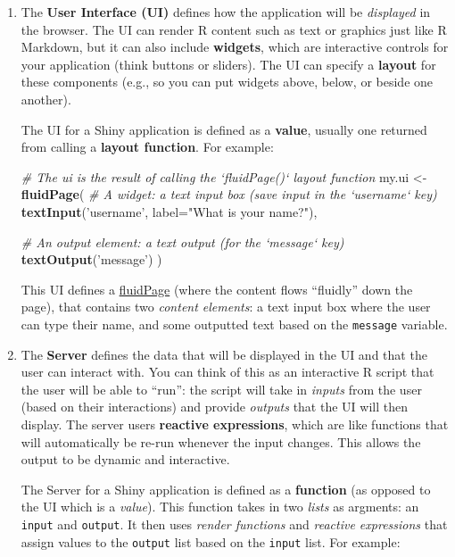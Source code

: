 \documentclass[]{book}
\newenvironment{Shaded}{\begin{snugshade}}{\end{snugshade}}
\newcommand{\KeywordTok}[1]{\textcolor[rgb]{0.13,0.29,0.53}{\textbf{#1}}}
\newcommand{\DataTypeTok}[1]{\textcolor[rgb]{0.13,0.29,0.53}{#1}}
\newcommand{\StringTok}[1]{\textcolor[rgb]{0.31,0.60,0.02}{#1}}
\newcommand{\CommentTok}[1]{\textcolor[rgb]{0.56,0.35,0.01}{\textit{#1}}}
\newcommand{\NormalTok}[1]{#1}
\theoremstyle{definition}
\theoremstyle{definition}
\theoremstyle{remark}
\begin{document}
\begin{enumerate}
\def\labelenumi{\arabic{enumi}.}
\item
  The \textbf{User Interface (UI)} defines how the application will be
  \emph{displayed} in the browser. The UI can render R content such as
  text or graphics just like R Markdown, but it can also include
  \textbf{widgets}, which are interactive controls for your application
  (think buttons or sliders). The UI can specify a \textbf{layout} for
  these components (e.g., so you can put widgets above, below, or beside
  one another).

  The UI for a Shiny application is defined as a \textbf{value}, usually
  one returned from calling a \textbf{layout function}. For example:

\begin{Shaded}
\begin{Highlighting}[]
\CommentTok{# The ui is the result of calling the `fluidPage()` layout function}
\NormalTok{my.ui <-}\StringTok{ }\KeywordTok{fluidPage}\NormalTok{(}
  \CommentTok{# A widget: a text input box (save input in the `username` key)}
  \KeywordTok{textInput}\NormalTok{(}\StringTok{'username'}\NormalTok{, }\DataTypeTok{label=}\StringTok{"What is your name?"}\NormalTok{),}

  \CommentTok{# An output element: a text output (for the `message` key)}
  \KeywordTok{textOutput}\NormalTok{(}\StringTok{'message'}\NormalTok{)}
\NormalTok{)}
\end{Highlighting}
\end{Shaded}

  This UI defines a
  \href{https://shiny.rstudio.com/reference/shiny/latest/fluidPage.html}{fluidPage}
  (where the content flows ``fluidly'' down the page), that contains two
  \emph{content elements}: a text input box where the user can type
  their name, and some outputted text based on the \texttt{message}
  variable.
\item
  The \textbf{Server} defines the data that will be displayed in the UI
  and that the user can interact with. You can think of this as an
  interactive R script that the user will be able to ``run'': the script
  will take in \emph{inputs} from the user (based on their interactions)
  and provide \emph{outputs} that the UI will then display. The server
  users \textbf{reactive expressions}, which are like functions that
  will automatically be re-run whenever the input changes. This allows
  the output to be dynamic and interactive.

  The Server for a Shiny application is defined as a \textbf{function}
  (as opposed to the UI which is a \emph{value}). This function takes in
  two \emph{lists} as argments: an \texttt{input} and \texttt{output}.
  It then uses \emph{render functions} and \emph{reactive expressions}
  that assign values to the \texttt{output} list based on the
  \texttt{input} list. For example:


\end{enumerate}
\end{document}
